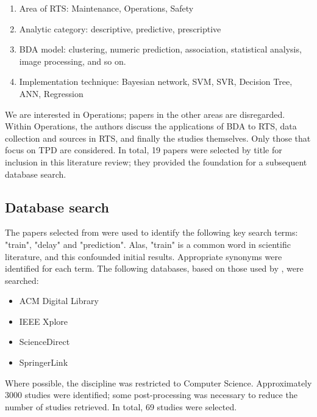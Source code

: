 \documentclass{article}
\begin{document}
\begin{enumerate}
	\item Area of RTS: Maintenance, Operations, Safety
	\item Analytic category: descriptive, predictive, prescriptive
	\item BDA model: clustering, numeric prediction, association, statistical analysis, image processing, and so on.
	\item Implementation technique: Bayesian network, SVM, SVR, Decision Tree, ANN, Regression
\end{enumerate}

We are interested in Operations; papers in the other areas are disregarded. Within Operations, the authors discuss the applications of BDA to RTS, data collection and sources in RTS, and finally the studies themselves.
Only those that focus on TPD are considered. In total, 19 papers were selected by title for inclusion in this literature review; they provided the foundation for a subsequent database search.

\subsection{Database search}

The papers selected from \cite{ghofrani_et_al_2018} were used to identify the following key search terms: "train", "delay" and "prediction". Alas, "train" is a common word in scientific literature, and this confounded initial results. Appropriate synonyms were identified for each term. The following databases, based on those used by \cite{heckman_williams_2011}, were searched:

\begin{multicols}{2}

\begin{itemize}
	\item ACM Digital Library
	\item IEEE Xplore
	\item ScienceDirect
	\item SpringerLink
\end{itemize}

\end{multicols}

Where possible, the discipline was restricted to Computer Science. Approximately 3000 studies were identified; some post-processing was necessary to reduce the number of studies retrieved. In total, 69 studies were selected.
\end{document}
